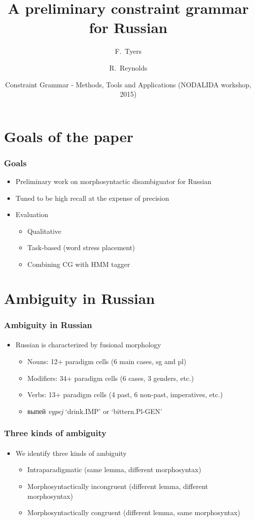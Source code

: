 \documentclass{beamer}
\title[A preliminary constraint grammar for Russian] %
{A preliminary constraint grammar for Russian}
\author[Tyers, Reynolds] %
{F.~Tyers \and R.~Reynolds}
\institute[UiT, The Arctic University of Norway] %
{
  Department of Languages and Linguistics\\
  UiT, The Arctic University of Norway
}
\date[NODALIDA-CG 2015] %
{Constraint Grammar - Methods, Tools and Applications (NODALIDA workshop, 2015)}
\newcommand{\rus}[1]{\foreignlanguage{russian}{#1}}
\begin{document}
\frame{\titlepage}
 
\section{Goals of the paper}

\begin{frame}
\frametitle{Goals}
\begin{itemize}
	\item Preliminary work on morphosyntactic disambiguator for Russian
	\pause
	\item Tuned to be high recall at the expense of precision
	\pause
	\item Evaluation
	\begin{itemize}
		\item Qualitative
		\item Task-based (word stress placement)
		\item Combining CG with HMM tagger
	\end{itemize}
\end{itemize}
\end{frame}

\section{Ambiguity in Russian} %

\begin{frame}
\frametitle{Ambiguity in Russian}
\framesubtitle{}
\begin{itemize}
	\item Russian is characterized by fusional morphology
	\begin{itemize}
		\item Nouns: 12+ paradigm cells (6 main cases, sg and pl)
		\item Modifiers: 34+ paradigm cells (6 cases, 3 genders, etc.)
		\item Verbs: 13+ paradigm cells (4 past, 6 non-past, imperatives, etc.)

		\item \rus{выпей} \emph{vypej} `drink.IMP' or `bittern.Pl-GEN'
	\end{itemize}
\end{itemize}
\end{frame}

\begin{frame}
\frametitle{Three kinds of ambiguity}
\framesubtitle{}
\begin{itemize}
	\item We identify three kinds of ambiguity
	\begin{itemize}
		\item Intraparadigmatic (same lemma, different morphosyntax)
		\item Morphosyntactically incongruent (different lemma, different morphosyntax)		
		\item Morphosyntactically congruent (different lemma, same morphosyntax)
	\end{itemize}
\end{itemize}
\end{frame}
\end{document}
